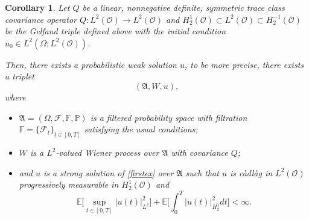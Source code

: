 \documentclass[english,a4paper,11pt]{amsart}
\theoremstyle{plain}
\newtheorem{corollary}[theorem]{Corollary}
\theoremstyle{definition}
\theoremstyle{remark}
\numberwithin{equation}{section}
\newcommand{\CO}{{{ \mathcal O }}}
\newcommand{\EE}{ \mathbb{E} }
\newcommand{\Fcal} {{\mathcal F}}
\newcommand{\Ocal} {{\mathcal O}}
\newcommand{\Afrak} {{\mathfrak A}}
\renewcommand{\P}{\mathbb{P}}
\begin{document}
 
 \begin{corollary}\label{Existenceheat}
	Let $Q$ be a  linear, nonnegative definite, symmetric trace class covariance
operator $Q:L^2(\CO)\to L^2(\CO) $ and  $H_2^1(\Ocal) \subset L^2(\Ocal) \subset H_2^{-1}(\Ocal) $ be the Gelfand triple  defined above with the initial condition $u_0\in L^2(\Omega; L^2(\Ocal))$.

Then, there exists a probabilistic weak solution $u$, to be more precise, there exists a triplet
$$
(\mathfrak{A},  W,u),
$$
where 
\begin{itemize}
	\item $\Afrak=(\Omega,\Fcal,\mathbb{F},\P)$ is a filtered probability space
	with filtration $\mathbb{F}=\{\Fcal_{t}\}_{t\in [0,T]}$ satisfying the usual conditions;
	\item $W$ is a $L^2$-valued Wiener process over $\mathfrak{A}$ with covariance $Q$;
	\item and $u$ is a strong solution of \eqref{firstex} over $\mathfrak{A}$ such that $u$ is c\`adl\`ag in $L^2(\Ocal)$ progressively measurable in $H_2^{1}(\CO)$ and
	$$
 \EE\bigg[\sup_{t\in[0,T]}|u(t)|_{L^2}^2\bigg] +\EE \Big[\int_0^T|u(t)|_{H_2^1}^2d t\Big]<\infty.
	$$
\end{itemize}
 \end{corollary}
 
\end{document}
